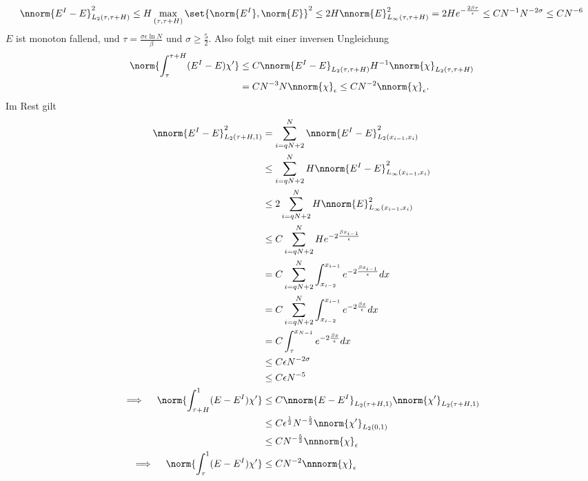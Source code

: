 \begin{beweis}
\begin{enumerate}
    \begin{align*}
      \nnorm{E^{I} - E}^{2}_{L_{2} (\tau, \tau + H)} \leq H \max_{(\tau, \tau + H)} \set{\norm{E^{I}}, \norm{E}}^{2} \leq 2 H \nnorm{E}^{2}_{L_{\infty}(\tau, \tau + H)} = 2 H e^{ - \frac{2 \beta \tau}{\epsilon}} \leq C N^{-1} N^{-2 \sigma} \leq C N^{-6}
    \end{align*}
    $E$ ist monoton fallend, und $\tau = \frac {\sigma\epsilon \ln N} \beta$ und $\sigma \geq \frac 5 2$. Also folgt mit einer inversen Ungleichung
    \begin{align*}
      \norm{\int_{\tau}^{\tau + H} (E^{I} - E) \chi'} &\leq C \nnorm{E^{I} - E}_{L_{2} (\tau, \tau + H)} H^{-1} \nnorm{\chi}_{L_{2}(\tau, \tau +H)}\\
      &= C N^{-3} N \nnorm{\chi}_{\epsilon} \leq  CN^{-2}\nnorm{\chi}_{\epsilon}. 
    \end{align*}
    Im Rest gilt
    \begin{align*}
      \nnorm{E^{I} - E}^{2}_{L_{2} (\tau + H, 1)} &= \sum_{i = qN + 2}^{N}   \nnorm{E^{I} - E}^{2}_{L_{2} (x_{i-1}, x_{i})} \\
      &\leq \sum_{i = qN + 2}^{N} H \nnorm{E^{I} - E}^{2}_{L_{\infty} (x_{i-1}, x_{i})} \\
      &\leq 2 \sum_{i = qN + 2}^{N} H \nnorm{E}^{2}_{L_{\infty} (x_{i-1}, x_{i})} \\
      &\leq C \sum_{i = qN + 2}^{N} H e^{ - 2 \frac{\beta x_{i-1}}{\epsilon}}\\
      &= C \sum_{i = qN + 2}^{ N} \int_{x_{i-2}}^{x_{i-1}} e^{ - 2 \frac{\beta x_{i-1}}{\epsilon}} dx\\
      &= C \sum_{i = qN + 2}^{ N} \int_{x_{i-2}}^{x_{i-1}} e^{ - 2 \frac{\beta x}{\epsilon}} dx\\
      &= C \int_{\tau}^{x_{N-1}}  e^{ - 2 \frac{\beta x}{\epsilon}} dx\\
      &\leq C \epsilon N^{- 2\sigma}\\
      &\leq C \epsilon N^{- 5}\\
      \implies \quad \norm{\int_{\tau + H}^{1} (E- E^{I}) \chi'} &\leq C \nnorm{E - E^{I}}_{L_{2}(\tau + H, 1)}  \nnorm{\chi'}_{L_{2}(\tau + H, 1)} \\
      &\leq C \epsilon^{ \frac 12} N^{ - \frac 5 2} \nnorm{\chi'}_{L_{2}(0, 1)}\\
      &\leq C N^{ - \frac 5 2} \nnnorm{\chi}_{\epsilon}\\
      \implies \quad \norm{\int_{\tau}^{1} (E- E^{I}) \chi'} &\leq C N^{-2} \nnnorm{\chi}_{\epsilon}
    \end{align*}

\end{enumerate}
\end{beweis}
